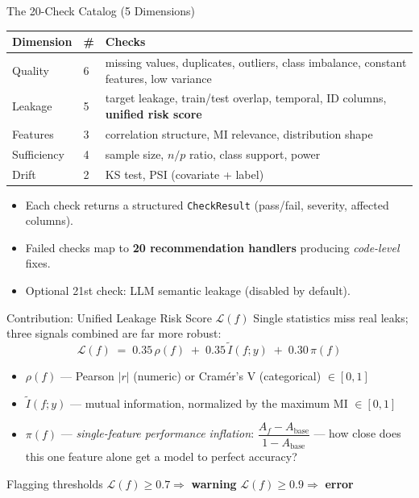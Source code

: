 \documentclass[11pt,aspectratio=169]{beamer}
\begin{document}
\begin{frame}{The 20-Check Catalog (5 Dimensions)}
  \centering\small
  \begin{tabular}{llp{6.2cm}}
    \toprule
    \textbf{Dimension} & \textbf{\#} & \textbf{Checks} \\
    \midrule
    Quality      & 6 & missing values, duplicates, outliers, class imbalance, constant features, low variance \\
    \rowcolor{tblAltRow}
    Leakage      & 5 & target leakage, train/test overlap, temporal, ID columns, \textbf{unified risk score} \\
    Features     & 3 & correlation structure, MI relevance, distribution shape \\
    \rowcolor{tblAltRow}
    Sufficiency  & 4 & sample size, $n/p$ ratio, class support, power \\
    Drift        & 2 & KS test, PSI (covariate + label) \\
    \bottomrule
  \end{tabular}
  \vspace{0.8em}
  \begin{itemize}
    \item Each check returns a structured \texttt{CheckResult} (pass/fail, severity, affected columns).
    \item Failed checks map to \textbf{20 recommendation handlers} producing \emph{code-level} fixes.
    \item Optional 21st check: LLM semantic leakage (disabled by default).
  \end{itemize}
\end{frame}

\begin{frame}{Contribution: Unified Leakage Risk Score $\mathcal{L}(f)$}
  Single statistics miss real leaks; three signals combined are far more robust:
  \begin{equation*}
    \mathcal{L}(f) \;=\; 0.35\,\rho(f) \;+\; 0.35\,\tilde{I}(f;y) \;+\; 0.30\,\pi(f)
  \end{equation*}
  \vspace{-0.8em}
  \begin{itemize}\setlength\itemsep{0.4em}
    \item $\rho(f)$ --- Pearson $|r|$ (numeric) or Cramér's V (categorical) $\in [0,1]$
    \item $\tilde{I}(f;y)$ --- mutual information, normalized by the maximum MI $\in [0,1]$
    \item $\pi(f)$ --- \emph{single-feature performance inflation}: $\dfrac{A_f - A_{\text{base}}}{1 - A_{\text{base}}}$ --- how close does this one feature alone get a model to perfect accuracy?
  \end{itemize}
  \vspace{0.4em}
  \begin{block}{Flagging thresholds}
    $\mathcal{L}(f) \ge 0.7 \Rightarrow$ \textbf{warning} \qquad
    $\mathcal{L}(f) \ge 0.9 \Rightarrow$ \textbf{error}
  \end{block}
\end{frame}
\end{document}
